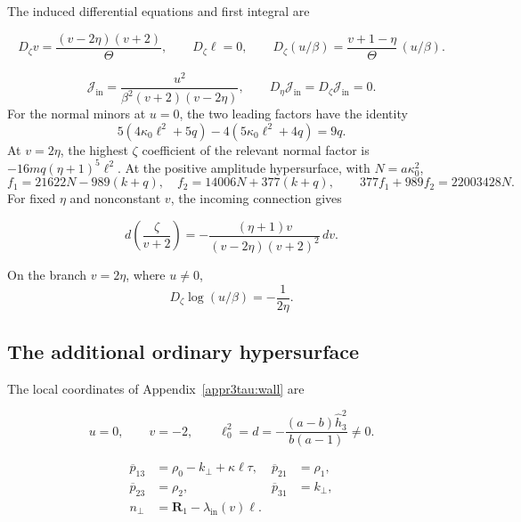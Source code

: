 The induced differential equations and first integral are

\begin{equation}\label{supp:appr3:ordinaryconnection}
 D_\zeta v=\frac{(v-2\eta )(v+2)}{\Theta},\qquad D_\zeta \ell=0,\qquad
 D_\zeta (u/\beta)=\frac{v+1-\eta }{\Theta}\,(u/\beta).
\end{equation}

\[
 \mathcal J_{\mathrm{in}}=
 \frac{u^2}{\beta^2(v+2)(v-2\eta)},\qquad
 D_\eta\mathcal J_{\mathrm{in}}=D_\zeta\mathcal J_{\mathrm{in}}=0.
\]
For the normal minors at $u=0$, the two leading factors have the
identity
\[
 5(4\kappa_0\ell^2+5q)-4(5\kappa_0\ell^2+4q)=9q.
\]
At $v=2\eta$, the highest $\zeta$ coefficient of the relevant
normal factor is $-16mq(\eta+1)^5\ell^2$.
At the positive amplitude hypersurface, with $N=a\kappa_0^2$,
\[
 f_1=21622N-989(k+q),\quad f_2=14006N+377(k+q),
 \qquad 377f_1+989f_2=22003428N.
\]
For fixed $\eta$ and nonconstant $v$, the incoming connection gives

\begin{equation}\label{supp:r3:residue-identity}
 d\left(\frac{\zeta}{v+2}\right)
 =-\frac{(\eta+1)v}{(v-2\eta)(v+2)^2}\,dv.
\end{equation}

On the branch $v=2\eta$, where $u\ne0$,
\begin{equation}\label{supp:r3:logarithmic-obstruction}
 D_\zeta\log(u/\beta)=-\frac1{2\eta}.
\end{equation}

\subsection{The additional ordinary hypersurface}

The local coordinates of Appendix~\ref{appr3tau:wall} are

\begin{equation}\label{supp:appr3tau:wallpoint}
 u=0,\qquad v=-2,\qquad
 \ell_0^2=d=-\frac{(a-b)\widehat h_3 ^2}{b(a-1)}\ne0.
\end{equation}

\begin{equation}\label{supp:appr3tau:coordinates}
 \begin{aligned}
 \overline p_{13}&=\rho_0-k_\perp+\kappa\ell\tau,& \overline p_{21}&=\rho_1,\\
 \overline p_{23}&=\rho_2,& \overline p_{31}&=k_\perp,\\
 n_\perp&=\boldsymbol R_1-\lambda_{\mathrm{in}}(v)\ell.
 \end{aligned}
\end{equation}


